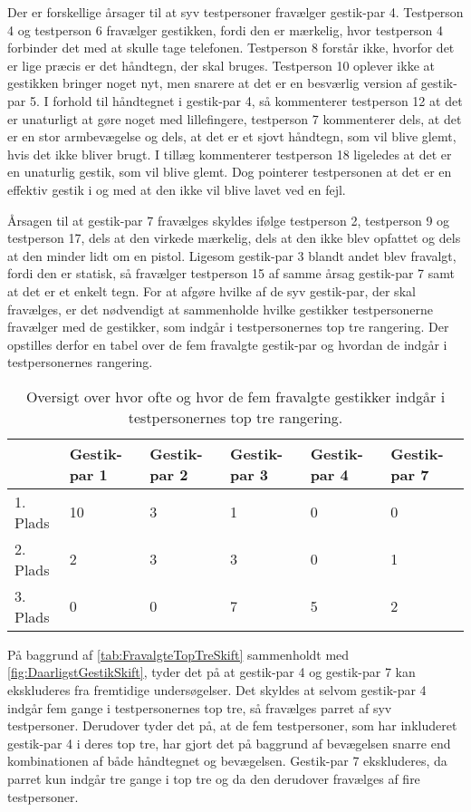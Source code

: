 Der er forskellige årsager til at syv testpersoner fravælger gestik-par 4. Testperson 4 og testperson 6 fravælger gestikken, fordi den er mærkelig, hvor testperson 4 forbinder det med at skulle tage telefonen. Testperson 8 forstår ikke, hvorfor det er lige præcis er det håndtegn, der skal bruges. Testperson 10 oplever ikke at gestikken bringer noget nyt, men snarere at det er en besværlig version af gestik-par 5. I forhold til håndtegnet i gestik-par 4, så kommenterer testperson 12 at det er unaturligt at gøre noget med lillefingere, testperson 7 kommenterer dels, at det er en stor armbevægelse og dels, at det er et sjovt håndtegn, som vil blive glemt, hvis det ikke bliver brugt. I tillæg kommenterer testperson 18 ligeledes at det er en unaturlig gestik, som vil blive glemt. Dog pointerer testpersonen at det er en effektiv gestik i og med at den ikke vil blive lavet ved en fejl. 

Årsagen til at gestik-par 7 fravælges skyldes ifølge testperson 2, testperson 9 og testperson 17, dels at den virkede mærkelig, dels at den ikke blev opfattet og dels at den minder lidt om en pistol. Ligesom gestik-par 3 blandt andet blev fravalgt, fordi den er statisk, så fravælger testperson 15 af samme årsag gestik-par 7 samt at det er et enkelt tegn.\blankline
%
For at afgøre hvilke af de syv gestik-par, der skal fravælges, er det nødvendigt at sammenholde hvilke gestikker testpersonerne fravælger med de gestikker, som indgår i testpersonernes top tre rangering. Der opstilles derfor en tabel over de fem fravalgte gestik-par og hvordan de indgår i testpersonernes rangering.    
%
\begin{table}[H]
	\centering
	\begin{tabular}{ | p{1.5cm} | p{2.1cm} | p{2.1cm} | p{2.1cm} | p{2.1cm} | p{2.1cm} |}
	\hline
		 & Gestik-par 1 & Gestik-par 2 & Gestik-par 3 & Gestik-par 4 & Gestik-par 7 \\ \hline
		1. Plads & 10 & 3 & 1 & 0 & 0\\ \hline
		2. Plads & 2 & 3 & 3 & 0 & 1\\ \hline
		3. Plads & 0 & 0 & 7 & 5 & 2\\ \hline
	\end{tabular}
	\caption{Oversigt over hvor ofte og hvor de fem fravalgte gestikker indgår i testpersonernes top tre rangering.}
	\label{tab:FravalgteTopTreSkift}
\end{table}
\noindent
%
På baggrund af \autoref{tab:FravalgteTopTreSkift} sammenholdt med \autoref{fig:DaarligstGestikSkift}, tyder det på at gestik-par 4 og gestik-par 7 kan ekskluderes fra fremtidige undersøgelser. Det skyldes at selvom gestik-par 4 indgår fem gange i testpersonernes top tre, så fravælges parret af syv testpersoner. Derudover tyder det på, at de fem testpersoner, som har inkluderet gestik-par 4 i deres top tre, har gjort det på baggrund af bevægelsen snarre end kombinationen af både håndtegnet og bevægelsen. Gestik-par 7 ekskluderes, da parret kun indgår tre gange i top tre og da den derudover fravælges af fire testpersoner. 

